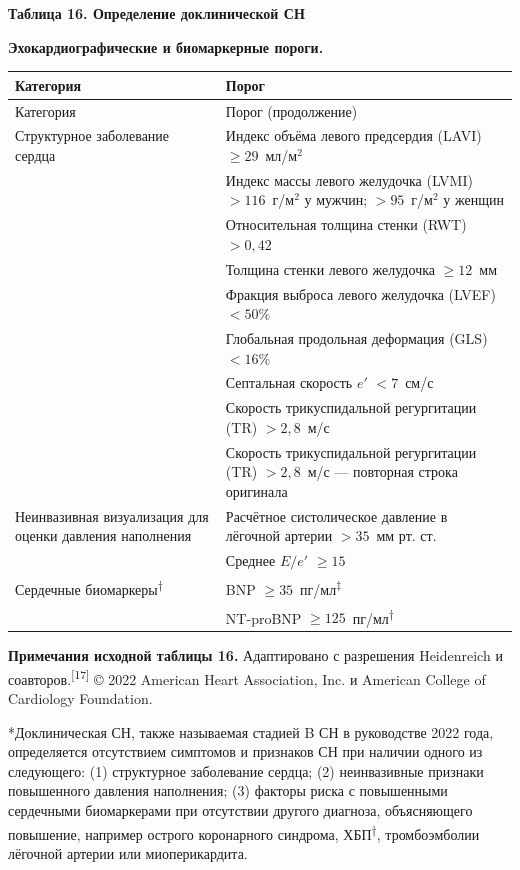\documentclass[11pt,a4paper]{article}
\newcommand{\src}[1]{\textsuperscript{[#1]}}
\newcommand{\heading}[1]{\par\medskip\textbf{#1}\par}
\begin{document}
\heading{Таблица 16. Определение доклинической СН}
\textbf{Эхокардиографические и биомаркерные пороги.}
{\small
\begin{longtable}{P{0.35\textwidth}P{0.59\textwidth}}
\toprule Категория & Порог\\\midrule
\endfirsthead
\toprule Категория & Порог (продолжение)\\\midrule
\endhead
Структурное заболевание сердца & Индекс объёма левого предсердия (LAVI) $\geq29$~мл/м$^2$\\
 & Индекс массы левого желудочка (LVMI) $>116$~г/м$^2$ у мужчин; $>95$~г/м$^2$ у женщин\\
 & Относительная толщина стенки (RWT) $>0{,}42$\\
 & Толщина стенки левого желудочка $\geq12$~мм\\
 & Фракция выброса левого желудочка (LVEF) $<50\%$\\
 & Глобальная продольная деформация (GLS) $<16\%$\\
 & Септальная скорость $e'$ $<7$~см/с\\
 & Скорость трикуспидальной регургитации (TR) $>2{,}8$~м/с\\
 & Скорость трикуспидальной регургитации (TR) $>2{,}8$~м/с --- повторная строка оригинала\\[4pt]
Неинвазивная визуализация для оценки давления наполнения & Расчётное систолическое давление в лёгочной артерии $>35$~мм рт. ст.\\
 & Среднее $E/e'$ $\geq15$\\[4pt]
Сердечные биомаркеры\textsuperscript{†} & BNP $\geq35$~пг/мл\textsuperscript{‡}\\
 & NT-proBNP $\geq125$~пг/мл\textsuperscript{†}\\
\bottomrule
\end{longtable}
}
\textbf{Примечания исходной таблицы 16.} Адаптировано с разрешения Heidenreich и соавторов.\src{17} © 2022 American Heart Association, Inc. и American College of Cardiology Foundation.

*Доклиническая СН, также называемая стадией B СН в руководстве 2022 года, определяется отсутствием симптомов и признаков СН при наличии одного из следующего: (1) структурное заболевание сердца; (2) неинвазивные признаки повышенного давления наполнения; (3) факторы риска с повышенными сердечными биомаркерами при отсутствии другого диагноза, объясняющего повышение, например острого коронарного синдрома, ХБП\textsuperscript{†}, тромбоэмболии лёгочной артерии или миоперикардита.
\end{document}
